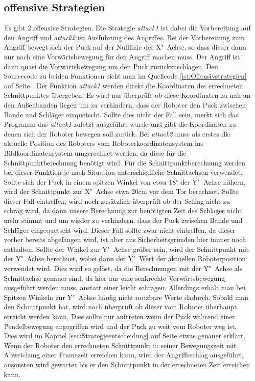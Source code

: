 \subsection{offensive Strategien}
Es gibt 2 offensive Strategien. Die Strategie \textit{attack1} ist dabei die Vorbereitung auf den Angriff und \textit{attack2} ist Ausführung des Angriffes. Bei der Vorbereitung zum Angriff bewegt sich der Puck auf der Nulllinie der X"~Achse, so dass dieser dann nur noch eine Vorwärtsbewegung für den Angriff machen muss. Der Angriff ist dann quasi die Vorwärtsbewegung um den Puck zurückzuschlagen.
Den Sourcecode zu beiden Funktionen sieht man im Quellcode \ref{lst:Offensivstrategien} auf Seite \pageref{lst:Offensivstrategien}.
Der Funktion \textit{attack1} werden direkt die Koordinaten des errechneten Schnittpunktes übergeben. Es wird nur überprüft ob diese Koordinaten zu nah an den Außenbanden liegen um zu verhindern, dass der Roboter den Puck zwischen Bande und Schläger einquetscht. Sollte dies nicht der Fall sein, merkt sich das Programm das \textit{attack1} zuletzt ausgeführt wurde und gibt die Koordinaten zu denen sich der Roboter bewegen soll zurück.
Bei \textit{attack2} muss als erstes die aktuelle Position des Roboters vom Roboterkoordinatensystem ins Bildkoordinatensystem umgerechnet werden, da diese für die Schnittpunktberechnung benötigt wird. Für die Schnittpunktberechnung werden bei dieser Funktion je nach Situation unterschiedliche Schnittachsen verwendet. Sollte sich der Puck in einem spitzen Winkel von etwa 18$^\circ$ der Y"~Achse nähern, wird der Schnittpunkt zur X"~Achse etwa 20cm vor dem Tor berechnet. Sollte dieser Fall eintreffen, wird noch zusätzlich überprüft ob der Schlag nicht zu schräg wird, da dann unsere Berechnung zur benötigten Zeit des Schlages nicht mehr stimmt und um wieder zu verhindern. dass der Puck zwischen Bande und Schläger eingequetscht wird. Dieser Fall sollte zwar nicht eintreffen, da dieser vorher bereits abgefangen wird, ist aber aus Sicherheitsgründen hier immer noch enthalten. Sollte der Winkel zur Y"~Achse größer sein, wird der Schnittpunkt mit der Y"~Achse berechnet, wobei dann der Y"~Wert der aktuellen Roboterposition verwendet wird. Dies wird so gelöst, da die Berechnungen mit der Y"~Achse als Schnittachse genauer sind, da hier nur eine senkrechte Vorwärtsbewegung ausgeführt werden muss, anstatt einer leicht schrägen. Allerdings erhält man bei Spitzen Winkeln zur Y"~Achse häufig nicht nutzbare Werte dadurch. Sobald man den Schnittpunkt hat, wird noch überprüft ob dieser vom Roboter überhaupt erreicht werden kann. Dies sollte nur auftreten wenn der Puck während einer Pendelbewegung angegriffen wird und der Puck zu weit vom Roboter weg ist. Dies wird im Kapitel \ref{sec:Strategieentscheidung} auf Seite \pageref{sec:Strategieentscheidung} etwas genauer erklärt. Wenn der Roboter den errechneten Schnittpunkt in seiner Bewegungszeit mit Abweichung einer Framezeit erreichen kann, wird der Angriffsschlag ausgeführt, ansonsten wird gewartet bis er den Schnittpunkt in der errechneten Zeit erreichen kann.
